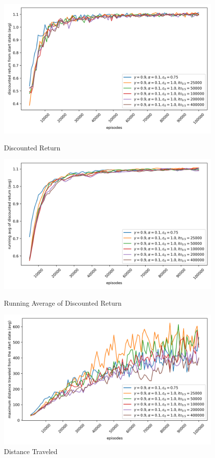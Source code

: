 \begin{figure}[H]
    \centering
    \begin{minipage}{0.32\linewidth}
        \centering
        \includegraphics[width=\linewidth]{plots/part1-d.exponential-rewards.png}
        \caption{Discounted Return}
    \end{minipage}
    \hfill
    \begin{minipage}{0.32\linewidth}
        \centering
        \includegraphics[width=\linewidth]{plots/part1-d.exponential-running_returns.png}
        \caption{Running Average of Discounted Return}
    \end{minipage}
    \hfill
    \begin{minipage}{0.32\linewidth}
        \centering
        \includegraphics[width=\linewidth]{plots/part1-d.exponential-distances.png}
        \caption{Distance Traveled}
    \end{minipage}


\end{figure}
